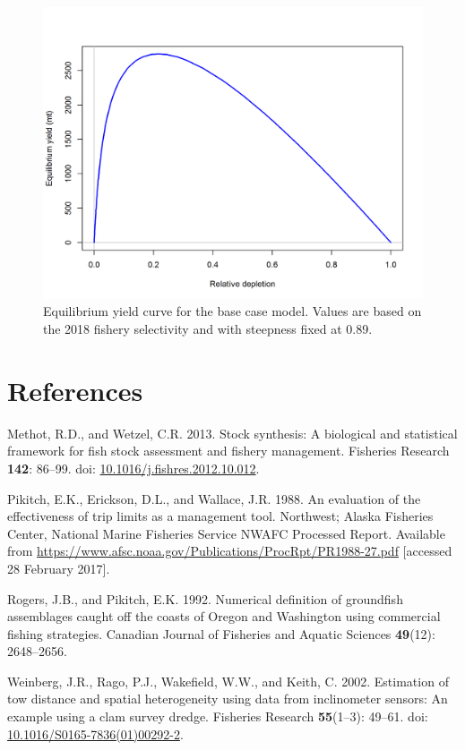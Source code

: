 \documentclass[12pt,]{article}
\begin{document}
\FloatBarrier

\begin{figure}
\centering
\includegraphics{r4ss/plots_mod1/yield1_yield_curve.png}
\caption{Equilibrium yield curve for the base case model. Values are
based on the 2018 fishery selectivity and with steepness fixed at 0.89.
\label{fig:yield}}
\end{figure}

\FloatBarrier

\newpage

\color{black}

\section{References}\label{references}

\renewcommand{\thepage}{}

\hypertarget{refs}{}
\hypertarget{ref-methot_stock_2013}{}
Methot, R.D., and Wetzel, C.R. 2013. Stock synthesis: A biological and
statistical framework for fish stock assessment and fishery management.
Fisheries Research \textbf{142}: 86--99. doi:
\href{https://doi.org/10.1016/j.fishres.2012.10.012}{10.1016/j.fishres.2012.10.012}.

\hypertarget{ref-pikitch_evaluation_1988}{}
Pikitch, E.K., Erickson, D.L., and Wallace, J.R. 1988. An evaluation of
the effectiveness of trip limits as a management tool. Northwest; Alaska
Fisheries Center, National Marine Fisheries Service NWAFC Processed
Report. Available from
\url{https://www.afsc.noaa.gov/Publications/ProcRpt/PR1988-27.pdf}
{[}accessed 28 February 2017{]}.

\hypertarget{ref-rogers_numerical_1992}{}
Rogers, J.B., and Pikitch, E.K. 1992. Numerical definition of groundfish
assemblages caught off the coasts of Oregon and Washington using
commercial fishing strategies. Canadian Journal of Fisheries and Aquatic
Sciences \textbf{49}(12): 2648--2656.

\hypertarget{ref-weinberg_estimation_2002}{}
Weinberg, J.R., Rago, P.J., Wakefield, W.W., and Keith, C. 2002.
Estimation of tow distance and spatial heterogeneity using data from
inclinometer sensors: An example using a clam survey dredge. Fisheries
Research \textbf{55}(1--3): 49--61. doi:
\href{https://doi.org/10.1016/S0165-7836(01)00292-2}{10.1016/S0165-7836(01)00292-2}.
\end{document}
